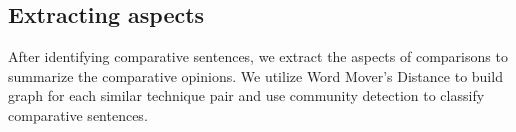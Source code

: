 \subsection{Extracting aspects}
After identifying comparative sentences, we extract the aspects of comparisons to summarize the comparative opinions. We utilize Word Mover's Distance to build graph for each similar technique pair and use community detection to classify comparative sentences. 
